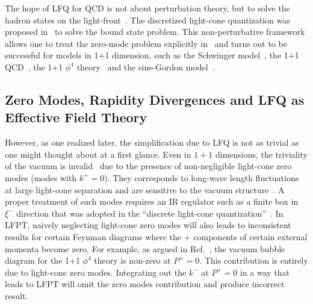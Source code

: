 \documentclass[twocolumn,superscriptaddress,longbibliography,10pt]{revtex4-1}
\begin{document}
The hope of LFQ for QCD is not about perturbation theory, but to solve the hadron states on the light-front~\cite{Brodsky:1997de}.
The discretized light-cone quantization was proposed in~\cite{Pauli:1985ps} to solve the bound state problem.
This non-perturbative framework allows one to treat the zero-mode problem explicitly in~\cite{Heinzl:1991myy,Burkardt:1992sz,Yamawaki:1998cy} and turns out to be successful for models in 1+1 dimension, such as the Schwinger
model~\cite{Heinzl:1991myy,McCartor:1994im,Harada:1995au,Kalloniatis:1996db}, the 1+1 QCD~\cite{Zhitnitsky:1985um,Burkardt:1989wy,Srivastava:2000cf},
the 1+1 $\phi^4$ theory~\cite{Harindranath:1987db} and the sine-Gordon model~\cite{Burkardt:1992sz}.

\subsection{Zero Modes, Rapidity Divergences and LFQ as Effective Field Theory}

However, as one realized later, the simplification due to LFQ is not as trivial as one might thought about at a first glance.  Even in $1+1$ dimensions, the triviality of the vacuum is invalid~\cite{Nakanishi:1976vf} due to the presence of non-negligible light-cone zero modes (modes with $k^+=0$). They corresponds to long-wave length fluctuations at large light-cone separation and are sensitive to the vacuum structure~\cite{Yamawaki:1998cy}. A proper treatment of such modes requires an IR regulator such as a finite box in $\xi^{-}$ direction that was adopted in the ``discrete light-cone quantization''~\cite{Pauli:1985ps}.  In LFPT, naively neglecting light-cone zero modes will also leads to inconsistent results for certain Feynman diagrams where the $+$ components of certain external momenta become zero. For example, as argued in Ref.~\cite{Collins:2018aqt}, the vacuum bubble diagram for the 1+1 $\phi^4$ theory is non-zero at $P^+=0$. This contribution is entirely due to light-cone zero modes. Integrating out the $k^-$ at $P^+=0$ in a way that leads to LFPT will omit the zero modes contribution and produce incorrect result.
\end{document}

